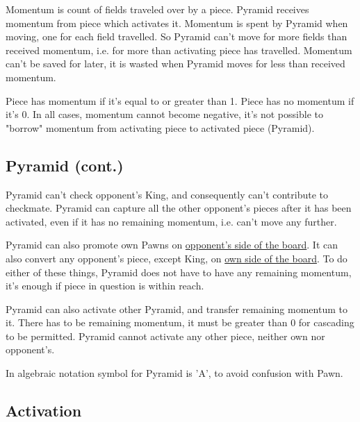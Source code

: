 Momentum is count of fields traveled over by a piece. Pyramid receives
momentum from piece which activates it. Momentum is spent by Pyramid when
moving, one for each field travelled. So Pyramid can't move for more
fields than received momentum, i.e. for more than activating piece has
travelled. Momentum can't be saved for later, it is wasted when Pyramid
moves for less than received momentum.

Piece has momentum if it's equal to or greater than 1. Piece has no momentum
if it's 0. In all cases, momentum cannot become negative, it's not possible
to "borrow" momentum from activating piece to activated piece (Pyramid).

\clearpage %

\subsection*{Pyramid (cont.)}

Pyramid can't check opponent's King, and consequently can't contribute to
checkmate. Pyramid can capture all the other opponent's pieces after it has
been activated, even if it has no remaining momentum, i.e. can't move any
further.

Pyramid can also promote own Pawns on
\hyperref[sec:Definitions/Sides of a chessboard]{opponent's side of the board}.
It can also convert any opponent's piece, except King, on
\hyperref[sec:Definitions/Sides of a chessboard]{own side of the board}.
To do either of these things, Pyramid does not have to have any remaining
momentum, it's enough if piece in question is within reach.

Pyramid can also activate other Pyramid, and transfer remaining momentum to it.
There has to be remaining momentum, it must be greater than 0 for cascading
to be permitted. Pyramid cannot activate any other piece, neither own nor
opponent's.

In algebraic notation symbol for Pyramid is 'A', to avoid confusion with Pawn.

\clearpage %

\subsection*{Activation}

